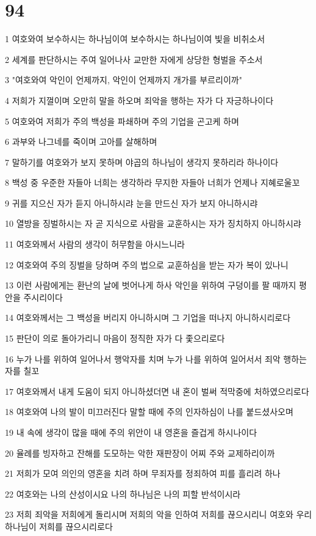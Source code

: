 \chapter{94}

\par 1 여호와여 보수하시는 하나님이여 보수하시는 하나님이여 빛을 비취소서
\par 2 세계를 판단하시는 주여 일어나사 교만한 자에게 상당한 형벌을 주소서
\par 3 "여호와여 악인이 언제까지, 악인이 언제까지 개가를 부르리이까"
\par 4 저희가 지껄이며 오만히 말을 하오며 죄악을 행하는 자가 다 자긍하나이다
\par 5 여호와여 저희가 주의 백성을 파쇄하며 주의 기업을 곤고케 하며
\par 6 과부와 나그네를 죽이며 고아를 살해하며
\par 7 말하기를 여호와가 보지 못하며 야곱의 하나님이 생각지 못하리라 하나이다
\par 8 백성 중 우준한 자들아 너희는 생각하라 무지한 자들아 너희가 언제나 지혜로울꼬
\par 9 귀를 지으신 자가 듣지 아니하시랴 눈을 만드신 자가 보지 아니하시랴
\par 10 열방을 징벌하시는 자 곧 지식으로 사람을 교훈하시는 자가 징치하지 아니하시랴
\par 11 여호와께서 사람의 생각이 허무함을 아시느니라
\par 12 여호와여 주의 징벌을 당하며 주의 법으로 교훈하심을 받는 자가 복이 있나니
\par 13 이런 사람에게는 환난의 날에 벗어나게 하사 악인을 위하여 구덩이를 팔 때까지 평안을 주시리이다
\par 14 여호와께서는 그 백성을 버리지 아니하시며 그 기업을 떠나지 아니하시리로다
\par 15 판단이 의로 돌아가리니 마음이 정직한 자가 다 좇으리로다
\par 16 누가 나를 위하여 일어나서 행악자를 치며 누가 나를 위하여 일어서서 죄악 행하는 자를 칠꼬
\par 17 여호와께서 내게 도움이 되지 아니하셨더면 내 혼이 벌써 적막중에 처하였으리로다
\par 18 여호와여 나의 발이 미끄러진다 말할 때에 주의 인자하심이 나를 붙드셨사오며
\par 19 내 속에 생각이 많을 때에 주의 위안이 내 영혼을 즐겁게 하시나이다
\par 20 율례를 빙자하고 잔해를 도모하는 악한 재판장이 어찌 주와 교제하리이까
\par 21 저희가 모여 의인의 영혼을 치려 하며 무죄자를 정죄하여 피를 흘리려 하나
\par 22 여호와는 나의 산성이시요 나의 하나님은 나의 피할 반석이시라
\par 23 저희 죄악을 저희에게 돌리시며 저희의 악을 인하여 저희를 끊으시리니 여호와 우리 하나님이 저희를 끊으시리로다

